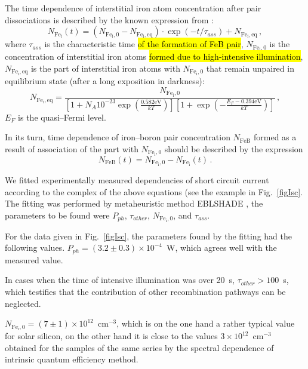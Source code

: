 \documentclass[sn-mathphys]{sn-jnl}%
\theoremstyle{thmstyleone}%
\theoremstyle{thmstyletwo}%
\theoremstyle{thmstylethree}%
\begin{document}
The time dependence of interstitial iron atom concentration
after pair dissociations is described by the known expression from \cite{MurphyJAP2011}:
\begin{equation}
\label{eqNFet}
N_\mathrm{Fe_i}(t)=(N_\mathrm{Fe_i,0}-N_\mathrm{Fe_i,eq})\cdot
\exp(-t/\tau_{ass})+N_\mathrm{Fe_i,eq}\,,
\end{equation}
where
$\tau_{ass}$ is the characteristic time \hl{of the formation of FeB pair},
$N_\mathrm{Fe_i,0}$ is the concentration of interstitial iron atoms
\hl{formed due to high-intensive illumination},
$N_\mathrm{Fe_i,eq}$ is the part of interstitial iron atoms with $N_\mathrm{Fe_i,0}$
that remain unpaired in equilibrium state (after a long exposition in darkness)\cite{FeB:kinetic}:
\begin{equation}
\label{eqNFeeq}
N_\mathrm{Fe_i,eq}=\frac{N_\mathrm{Fe_i,0}}
   {\left[1+N_A 10^{-23}\exp\left(\frac{0.582\mathrm{eV}}{kT}\right)\right]
    \left[1+\exp\left(-\frac{E_F-0.394\mathrm{eV}}{kT}\right)\right]}\,,
\end{equation}
$E_F$ is the quasi--Fermi level.

In its turn, time dependence of iron--boron pair concentration
$N_\mathrm{FeB}$ formed as a result of association of the part with $N_\mathrm{Fe_i,0}$
should be described by the expression
\begin{equation}
\label{eqNFeBt}
N_\mathrm{FeB}(t)=N_\mathrm{Fe_i,0}-N_\mathrm{Fe_i}(t)\,.
\end{equation}

We fitted experimentally measured dependencies of short circuit current
according to the complex of the above equations (see the example in Fig.~\ref{figIsc}.
The fitting was performed by metaheuristic method EBLSHADE \cite{EBLSHADE},
the parameters to be found were $P_{ph}$, $\tau_{other}$, $N_\mathrm{Fe_i,0}$, and $\tau_{ass}$.

For the data given in Fig.~\ref{figIsc},
the parameters found by the fitting had the following values.
$P_{ph}=(3.2\pm0.3)\times 10^{-4}$~W, which agrees well with the measured value.

In cases when the time of intensive illumination was over 20~s,
$\tau_{other}>100$~s, which testifies that the contribution of other recombination pathways can be neglected.

$N_\mathrm{Fe_i,0}=(7\pm1)\times10^{12}$~cm$^{-3}$,
      which is on the one hand a rather typical value for solar silicon,
      on the other hand it is close to the values $3\times10^{12}$~cm$^{-3}$
      obtained for the samples of the same series by the spectral dependence of intrinsic quantum efficiency method.
\end{document}
